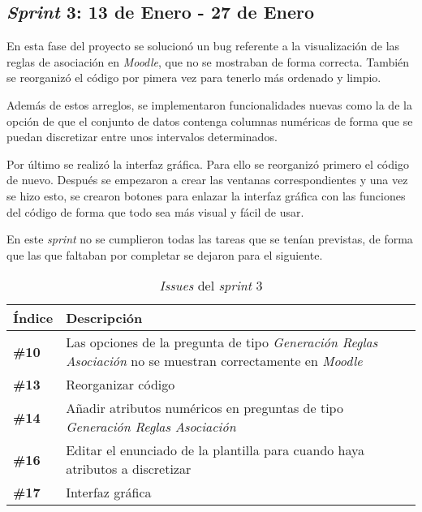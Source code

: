 
\subsection{\textit{Sprint} 3: 13 de Enero - 27 de Enero}
En esta fase del proyecto se solucionó un bug referente a la visualización de las reglas de asociación en \textit{Moodle}, que no se mostraban de forma correcta. También se reorganizó el código por pimera vez para tenerlo más ordenado y limpio.

Además de estos arreglos, se implementaron funcionalidades nuevas como la de la opción de que el conjunto de datos contenga columnas numéricas de forma que se puedan discretizar entre unos intervalos determinados.

Por último se realizó la interfaz gráfica. Para ello se reorganizó primero el código de nuevo. Después se empezaron a crear las ventanas correspondientes y una vez se hizo esto, se crearon botones para enlazar la interfaz gráfica con las funciones del código de forma que todo sea más visual y fácil de usar.

En este \textit{sprint} no se cumplieron todas las tareas que se tenían previstas, de forma que las que faltaban por completar se dejaron para el siguiente.

\begin{table}[h]
	\centering
	\begin{tabularx}{\linewidth}{X p{}}
		\toprule
		\textbf{Índice} & \textbf{Descripción} \\
		\toprule
		\textbf{\#10} & Las opciones de la pregunta de tipo \textit{Generación Reglas Asociación} no se muestran correctamente en \textit{Moodle} \\
		\textbf{\#13} & Reorganizar código \\
		\textbf{\#14} & Añadir atributos numéricos en preguntas de tipo \textit{Generación Reglas Asociación} \\
		\textbf{\#16} & Editar el enunciado de la plantilla para cuando haya atributos a discretizar \\
		\textbf{\#17} & Interfaz gráfica \\
		\bottomrule
	\end{tabularx}
	\caption{\textit{Issues} del \textit{sprint} 3}
\end{table}


